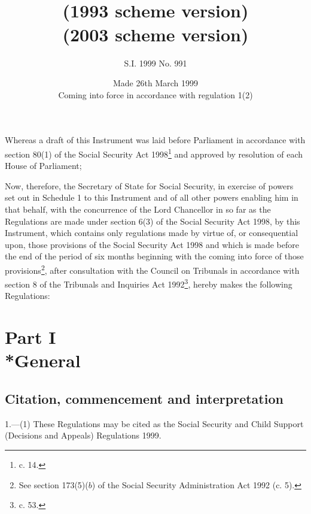 \documentclass[12pt,a4paper]{article}
\title{\regstitle\\(1993 scheme version)}
\title{\regstitle\\(2003 scheme version)}
\author{S.I. 1999 No. 991}
\date{Made 26th March 1999\\Coming into force in accordance with regulation 1(2)}
\begin{document}
\maketitle

\noindent
Whereas a draft of this Instrument was laid before Parliament in accordance with section 80(1) of the Social Security Act 1998\footnote{ c. 14.} and approved by resolution of each House of Parliament;

 Now, therefore, the Secretary of State for Social Security, in exercise of powers set out in Schedule 1 to this Instrument and of all other powers enabling him in that behalf, with the concurrence of the Lord Chancellor in so far as the Regulations are made under section 6(3) of the Social Security Act 1998, by this Instrument, which contains only regulations made by virtue of, or consequential upon, those provisions of the Social Security Act 1998 and which is made before the end of the period of six months beginning with the coming into force of those provisions\footnote{\frenchspacing See section 173(5)($b$) of the Social Security Administration Act 1992 (c. 5).}, after consultation with the Council on Tribunals in accordance with section 8 of the Tribunals and Inquiries Act 1992\footnote{ c. 53.}, hereby makes the following Regulations:

{\sloppy

\tableofcontents

}

\bigskip

\setcounter{secnumdepth}{-2}

\section[Part I --- General]{Part I\\*General}

\renewcommand\parthead{--- Part I}

\subsection[1. Citation, commencement and interpretation]{Citation, commencement and interpretation}

1.—(1) These Regulations may be cited as the Social Security and Child Support (Decisions and Appeals) Regulations 1999.
\end{document}
